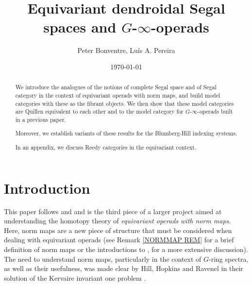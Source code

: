 \documentclass[a4paper,10pt
,draft
]{article}%
\author{Peter Bonventre, Lu\'is A. Pereira}%
\title{Equivariant dendroidal Segal spaces and $G$-$\infty$-operads}%
\date{\today}
\begin{document}
	\maketitle%



\begin{abstract}
	We introduce the analogues of the notions of complete Segal space and of Segal category in the context of equivariant operads with norm maps, and build model categories with these as the fibrant objects. We then show that these model categories are Quillen equivalent to each other and to the model category for 
	$G$-$\infty$-operads built in a previous paper.

	Moreover, we establish variants of these results for the Blumberg-Hill indexing systems. 
      
	In an appendix, we discuss Reedy categories in the equivariant context.
\end{abstract}



\tableofcontents


%
 


\section{Introduction}

This paper follows \cite{Per17} and \cite{BP17} and is the third piece of a larger project aimed at understanding the homotopy theory of 
\textit{equivariant operads with norm maps}.
Here, norm maps are a new piece of structure that must be considered when dealing with equivariant operads
(see Remark \ref{NORMMAP REM} for a brief definition of norm maps or the introductions to 
\cite{Per17},\cite{BP17} for a more extensive discussion).
The need to understand norm maps, particularly in the context of $G$-ring spectra,
as well as their usefulness,
was made clear by Hill, Hopkins and Ravenel in their solution of the Kervaire invariant one problem \cite{HHR16}.
\end{document}
